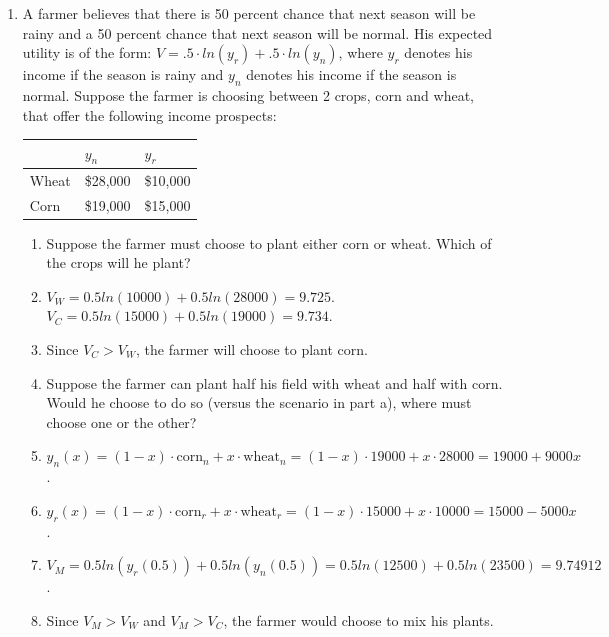 \documentclass{article}
\begin{document}
\begin{enumerate}
\begin{enumerate}[label=(\alph*)]
\item[] Consumer borrows when $c_1>m_1$. So $c^b_1=\frac{m_1+\frac{m_2}{1+r_b}}{1+\beta}>m_1\Rightarrow\beta<\frac{1}{1+r_b}=\frac{1}{1+0.25}=0.8$.
\item Continue to assume the interest rates in part (f) and m1 = m2 = 100. What is the consumer’s optimal consumption bundle if $\beta=.9$? 
\item[] Since $\beta=0.9>0.8$ and $\beta=0.9<0.952$, the consumer neither borrows nor saves and the optimal consumption bundle is the kink point at $(c_1,c_2)=(100,100)$.
\end{enumerate}
\item A farmer believes that there is 50 percent chance that next season will be rainy and a 50 percent chance that next season will be normal. His expected utility is of the form: $V=.5 · ln(y_r) + .5 · ln(y_n)$, where $y_r$ denotes his income if the season is rainy and $y_n$ denotes his income if the season is normal. Suppose the farmer is choosing between 2 crops, corn and wheat, that offer the following income prospects:
\newline
\begin{tabular}{lll}
\hline \hline
& $y_n$ & $y_r$ \\
\hline
Wheat & \$28,000 & \$10,000 \\
Corn & \$19,000 & \$15,000 \\
\hline \hline
\end{tabular}
 \begin{enumerate}[label=(\alph*)]
\item  Suppose the farmer must choose to plant either corn or wheat. Which of the crops will he plant?
\item[] $V_W=0.5ln(10000)+0.5ln(28000)=9.725$. $V_C=0.5ln(15000)+0.5ln(19000)=9.734$.
\item[] Since $V_C>V_W$, the farmer will choose to plant corn.
\item Suppose the farmer can plant half his field with wheat and half with corn. Would he choose to do so (versus the scenario in part a), where must choose one or the other?
\item[] $y_n(x)=(1-x)\cdot\text{corn}_n+x\cdot\text{wheat}_n=(1-x)\cdot19000+x\cdot28000=19000+9000x$.
\item[] $y_r(x)=(1-x)\cdot\text{corn}_r+x\cdot\text{wheat}_r=(1-x)\cdot15000+x\cdot10000=15000-5000x$.
\item[] $V_M=0.5ln(y_r(0.5))+0.5ln(y_n(0.5))=0.5ln(12500)+0.5ln(23500)=9.74912$.
\item[] Since $V_M>V_W$ and $V_M>V_C$, the farmer would choose to mix his plants.

\end{enumerate}
\end{enumerate}
\end{document}
